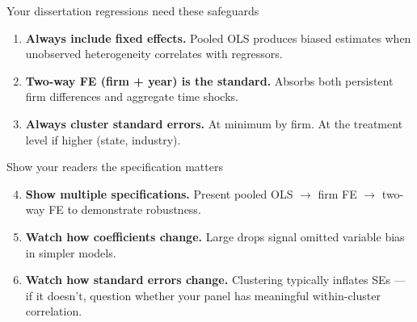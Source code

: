 \documentclass[aspectratio=169, 11pt]{beamer}
\begin{document}
\begin{frame}{Your dissertation regressions need these safeguards}

\vspace{0.4cm}

\begin{enumerate}
  \item \textbf{Always include fixed effects.}
        Pooled OLS produces biased estimates when unobserved
        heterogeneity correlates with regressors.

  \vspace{0.35cm}

  \item \textbf{Two-way FE (firm + year) is the standard.}
        Absorbs both persistent firm differences and aggregate
        time shocks.

  \vspace{0.35cm}

  \item \textbf{Always cluster standard errors.}
        At minimum by firm. At the treatment level if higher
        (state, industry).
\end{enumerate}

\end{frame}


\begin{frame}{Show your readers the specification matters}

\vspace{0.4cm}

\begin{enumerate}
  \setcounter{enumi}{3}

  \item \textbf{Show multiple specifications.}
        Present pooled OLS $\rightarrow$ firm FE $\rightarrow$
        two-way FE to demonstrate robustness.

  \vspace{0.35cm}

  \item \textbf{Watch how coefficients change.}
        Large drops signal omitted variable bias in simpler models.

  \vspace{0.35cm}

  \item \textbf{Watch how standard errors change.}
        Clustering typically inflates SEs --- if it doesn't,
        question whether your panel has meaningful within-cluster
        correlation.
\end{enumerate}

\end{frame}
\end{document}
